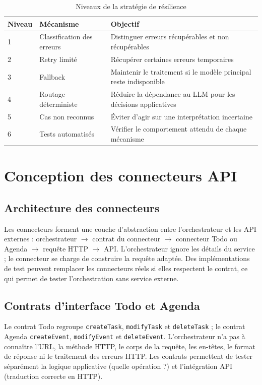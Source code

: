 \documentclass[11pt,a4paper,openany,oneside]{report}
\begin{document}
\begin{table}[htbp]
\centering\small
\caption{Niveaux de la stratégie de résilience}\label{tab:resilience-niveaux}
\begin{tabularx}{\textwidth}{@{}l p{4.2cm}X@{}}
\toprule
\textbf{Niveau} & \textbf{Mécanisme} & \textbf{Objectif} \\
\midrule
1 & Classification des erreurs & Distinguer erreurs récupérables et non récupérables \\
2 & Retry limité & Récupérer certaines erreurs temporaires \\
3 & Fallback & Maintenir le traitement si le modèle principal reste indisponible \\
4 & Routage déterministe & Réduire la dépendance au LLM pour les décisions applicatives \\
5 & Cas non reconnus & Éviter d'agir sur une interprétation incertaine \\
6 & Tests automatisés & Vérifier le comportement attendu de chaque mécanisme \\
\bottomrule
\end{tabularx}
\end{table}

\section{Conception des connecteurs API}
\subsection{Architecture des connecteurs}
Les connecteurs forment une couche d'abstraction entre l'orchestrateur et les API externes : orchestrateur $\rightarrow$ contrat du connecteur $\rightarrow$ connecteur Todo ou Agenda $\rightarrow$ requête HTTP $\rightarrow$ API. L'orchestrateur ignore les détails du service ; le connecteur se charge de construire la requête adaptée. Des implémentations de test peuvent remplacer les connecteurs réels si elles respectent le contrat, ce qui permet de tester l'orchestration sans service externe.

\subsection{Contrats d'interface Todo et Agenda}
Le contrat Todo regroupe \texttt{createTask}, \texttt{modifyTask} et \texttt{deleteTask} ; le contrat Agenda \texttt{createEvent}, \texttt{modifyEvent} et \texttt{deleteEvent}. L'orchestrateur n'a pas à connaître l'URL, la méthode HTTP, le corps de la requête, les en-têtes, le format de réponse ni le traitement des erreurs HTTP. Les contrats permettent de tester séparément la logique applicative (quelle opération ?) et l'intégration API (traduction correcte en HTTP).
\end{document}
